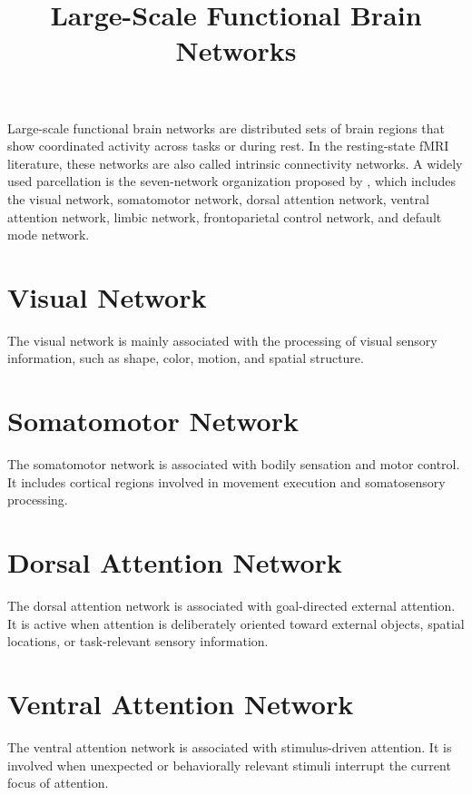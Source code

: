 \documentclass[a4paper]{article}
\title{Large-Scale Functional Brain Networks}
\date{}
\begin{document}
    \maketitle
    
    
    Large-scale functional brain networks are distributed sets of brain regions that show coordinated activity across tasks or during rest. In the resting-state fMRI literature, these networks are also called intrinsic connectivity networks. A widely used parcellation is the seven-network organization proposed by \citet{yeo-2011-the-organization-of-the-human-cerebral-cortex}, which includes the visual network, somatomotor network, dorsal attention network, ventral attention network, limbic network, frontoparietal control network, and default mode network.
    
    
    \section{Visual Network}
        
        The visual network is mainly associated with the processing of visual sensory information, such as shape, color, motion, and spatial structure.
    
    
    \section{Somatomotor Network}
        
        The somatomotor network is associated with bodily sensation and motor control. It includes cortical regions involved in movement execution and somatosensory processing.
    
    
    \section{Dorsal Attention Network}
        
        The dorsal attention network is associated with goal-directed external attention. It is active when attention is deliberately oriented toward external objects, spatial locations, or task-relevant sensory information.
    
    
    \section{Ventral Attention Network}
        
        The ventral attention network is associated with stimulus-driven attention. It is involved when unexpected or behaviorally relevant stimuli interrupt the current focus of attention.
    
\end{document}
